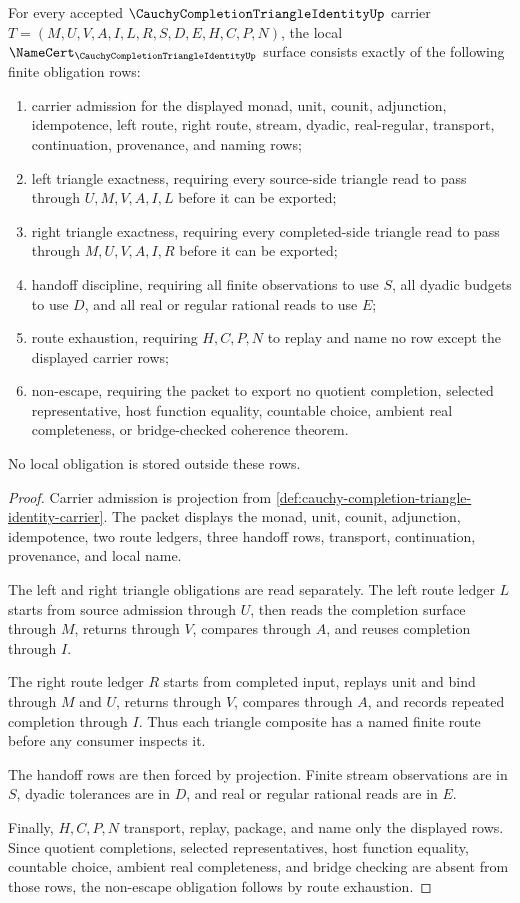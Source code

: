\begin{theorem}
\label{thm:cauchy-completion-triangle-identity-namecert-obligations}
For every accepted $\CauchyCompletionTriangleIdentityUp$ carrier $T=(M,U,V,A,I,L,R,S,D,E,H,C,P,N)$, the local $\NameCert_{\CauchyCompletionTriangleIdentityUp}$ surface consists exactly of the following finite obligation rows:
\begin{enumerate}
\item carrier admission for the displayed monad, unit, counit, adjunction, idempotence, left route, right route, stream, dyadic, real-regular, transport, continuation, provenance, and naming rows;
\item left triangle exactness, requiring every source-side triangle read to pass through $U,M,V,A,I,L$ before it can be exported;
\item right triangle exactness, requiring every completed-side triangle read to pass through $M,U,V,A,I,R$ before it can be exported;
\item handoff discipline, requiring all finite observations to use $S$, all dyadic budgets to use $D$, and all real or regular rational reads to use $E$;
\item route exhaustion, requiring $H,C,P,N$ to replay and name no row except the displayed carrier rows;
\item non-escape, requiring the packet to export no quotient completion, selected representative, host function equality, countable choice, ambient real completeness, or bridge-checked coherence theorem.
\end{enumerate}
No local obligation is stored outside these rows.
\end{theorem}
\begin{proof}
Carrier admission is projection from \autoref{def:cauchy-completion-triangle-identity-carrier}. The packet displays the monad, unit, counit, adjunction, idempotence, two route ledgers, three handoff rows, transport, continuation, provenance, and local name.

The left and right triangle obligations are read separately. The left route ledger $L$ starts from source admission through $U$, then reads the completion surface through $M$, returns through $V$, compares through $A$, and reuses completion through $I$.

The right route ledger $R$ starts from completed input, replays unit and bind through $M$ and $U$, returns through $V$, compares through $A$, and records repeated completion through $I$. Thus each triangle composite has a named finite route before any consumer inspects it.

The handoff rows are then forced by projection. Finite stream observations are in $S$, dyadic tolerances are in $D$, and real or regular rational reads are in $E$.

Finally, $H,C,P,N$ transport, replay, package, and name only the displayed rows. Since quotient completions, selected representatives, host function equality, countable choice, ambient real completeness, and bridge checking are absent from those rows, the non-escape obligation follows by route exhaustion.
\end{proof}

